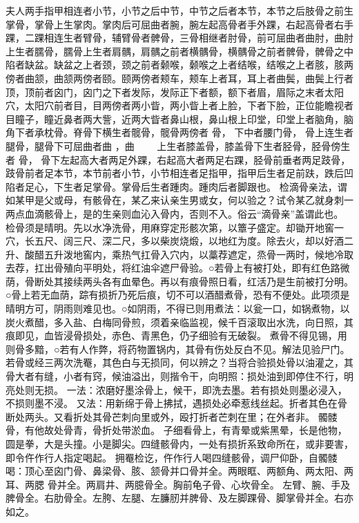 \documentclass[12pt,UTF8]{ctexbook}
\begin{document}
夫人两手指甲相连者小节，小节之后中节，中节之后者本节，本节之后肢骨之前生掌骨，掌骨上生掌肉。掌肉后可屈曲者腕，腕左起高骨者手外踝，右起高骨者右手踝，二踝相连生者臂骨，辅臂骨者髀骨，三骨相继者肘骨，前可屈曲者曲肘，曲肘上生者臑骨，臑骨上生者肩髃，肩髃之前者横髃骨，横髃骨之前者髀骨，髀骨之中陷者缺盆。缺盆之上者颈，颈之前者颡喉，颡喉之上者结喉，结喉之上者胲，胲两傍者曲颔，曲颔两傍者颐。颐两傍者颊车，颊车上者耳，耳上者曲鬓，曲鬓上行者顶，顶前者囟门，囟门之下者发际，发际正下者额，额下者眉，眉际之末者太阳穴，太阳穴前者目，目两傍者两小眥，两小眥上者上脸，下者下脸，正位能瞻视者目瞳子，瞳近鼻者两大訾，近两大眥者鼻山根，鼻山根上印堂，印堂上者脑角，脑角下者承枕骨。脊骨下横生者髋骨，髋骨两傍者 骨， 下中者腰门骨， 骨上连生者腿骨，腿骨下可屈曲者曲 ，曲　　 上生者膝盖骨，膝盖骨下生者胫骨，胫骨傍生者 骨， 骨下左起高大者两足外踝，右起高大者两足右踝，胫骨前垂者两足跂骨，跂骨前者足本节，本节前者小节，小节相连者足指甲，指甲后生者足前趺，跌后凹陷者足心，下生者足掌骨。掌骨后生者踵肉。踵肉后者脚跟也。
检滴骨亲法，谓如某甲是父或母，有骸骨在，某乙来认亲生男或女，何以验之？试令某乙就身刺一两点血滴骸骨上，是的生亲则血沁入骨内，否则不入。俗云“滴骨亲”盖谓此也。
检骨须是晴明。先以水净洗骨，用麻穿定形骸次第，以簟子盛定。却锄开地窖一穴，长五尺、阔三尺、深二尺，多以柴炭烧煅，以地红为度。除去火，却以好酒二升、酸醋五升泼地窖内，乘热气扛骨入穴内，以藁荐遮定，烝骨一两时，候地冷取去荐，扛出骨殖向平明处，将红油伞遮尸骨验。○若骨上有被打处，即有红色路微荫，骨断处其接续两头各有血晕色。再以有痕骨照日看，红活乃是生前被打分明。○骨上若无血荫，踪有损折乃死后痕，切不可以酒醋煮骨，恐有不便处。此项须是晴明方可，阴雨则难见也。○如阴雨，不得已则用煮法：以瓮一口，如锅煮物，以炭火煮醋，多入盐、白梅同骨煎，须着亲临监视，候千百滚取出水洗，向日照，其痕即见，血皆浸骨损处，赤色、青黑色，仍子细验有无破裂。
煮骨不得见锡，用则骨多黯，○若有人作弊，将药物置锅内，其骨有伤处反白不见。解法见验尸门。
若骨或经三两次洗罨，其色白与无损同，何以辨之？当将合验损处骨以油灌之，其骨大者有缝，小者有窍，候油溢出，则揩令干，向明照：损处油到即停住不行，明亮处则无损。
一法：浓磨好墨涂骨上，候干，即洗去墨。若有损处则墨必浸入，不损则墨不浸。
又法：用新绵于骨上拂拭，遇损处必牵惹线丝起。折者其色在骨断处两头。又看折处其骨芒刺向里或外，殴打折者芒刺在里；在外者非。
髑髅骨，有他故处骨青，骨折处带淤血。
子细看骨上，有青晕或紫黑晕，长是他物，圆是拳，大是头撞。小是脚尖。四缝骸骨内，一处有损折系致命所在，或非要害，即令仵作行人指定喝起。
拥罨检讫，仵作行人喝四缝骸骨，调尸仰卧，自髑髅喝：顶心至囟门骨、鼻梁骨、胲、颔骨并口骨并全。两眼眶、两额角、两太阳、两耳、两腮 骨并全。两肩井、两臆骨全。胸前龟子骨、心坎骨全。
左臂、腕、手及脾骨全。右肋骨全。左胯、左腿、左臁肕并脾骨、及左脚踝骨、脚掌骨并全。右亦如之。
\end{document}
